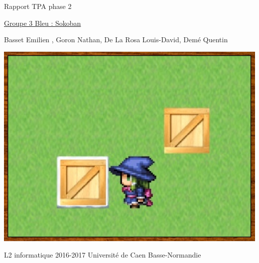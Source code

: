 \documentclass{article}
\begin{document}
\begin{titlepage}
\begin{center}
\Huge Rapport TPA phase 2

\normalsize
\vspace{0.5cm}
\Large {\underline{ Groupe 3 Bleu : Sokoban} }

\vspace{1cm}

\normalsize
Basset Emilien , Goron Nathan, De La Rosa Louis-David, Demé Quentin

\vspace{1cm}
\begin{center}
\includegraphics[scale=0.7]{img/main.jpg}
\end{center}
\vspace{3.5cm}
L2 informatique 2016-2017 Université de Caen Basse-Normandie
\end{center}
\end{titlepage}

\newpage
\tableofcontents
\end{document}
